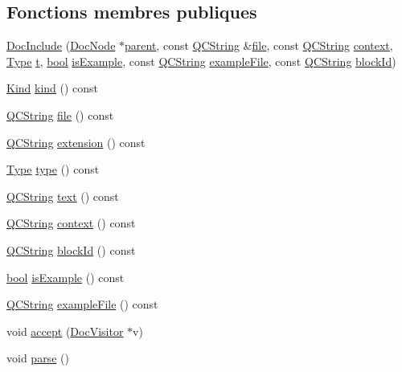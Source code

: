 \subsection*{Fonctions membres publiques}
\begin{DoxyCompactItemize}
\item 
\hyperlink{class_doc_include_aa4951530d659c138f2941a5827c8dbd9}{Doc\+Include} (\hyperlink{class_doc_node}{Doc\+Node} $\ast$\hyperlink{class_doc_node_a990d8b983962776a647e6231d38bd329}{parent}, const \hyperlink{class_q_c_string}{Q\+C\+String} \&\hyperlink{class_doc_include_a49b9503cc07277d253f236e955cf8c14}{file}, const \hyperlink{class_q_c_string}{Q\+C\+String} \hyperlink{class_doc_include_aaaf56e2383e4ac4aa921cfd38b2d9fdd}{context}, \hyperlink{class_doc_include_a72aa0fd397546547aadf356348ff3eaf}{Type} \hyperlink{058__bracket__recursion_8tcl_a69e959f6901827e4d8271aeaa5fba0fc}{t}, \hyperlink{qglobal_8h_a1062901a7428fdd9c7f180f5e01ea056}{bool} \hyperlink{class_doc_include_a73e2aff33b3bcf0ee6995c5f3af4be9b}{is\+Example}, const \hyperlink{class_q_c_string}{Q\+C\+String} \hyperlink{class_doc_include_aa54725d3a9ebb17c85b73890fae57fd8}{example\+File}, const \hyperlink{class_q_c_string}{Q\+C\+String} \hyperlink{class_doc_include_a81da494c0275017e56901b6c18dea3a8}{block\+Id})
\item 
\hyperlink{class_doc_node_aebd16e89ca590d84cbd40543ea5faadb}{Kind} \hyperlink{class_doc_include_ad1a68704c4dd1f8b70e2061709e9f20a}{kind} () const 
\item 
\hyperlink{class_q_c_string}{Q\+C\+String} \hyperlink{class_doc_include_a49b9503cc07277d253f236e955cf8c14}{file} () const 
\item 
\hyperlink{class_q_c_string}{Q\+C\+String} \hyperlink{class_doc_include_a47150b88e627477ba5fc355249f08761}{extension} () const 
\item 
\hyperlink{class_doc_include_a72aa0fd397546547aadf356348ff3eaf}{Type} \hyperlink{class_doc_include_ae30cfe2992872d3e8e9b46e4f453603f}{type} () const 
\item 
\hyperlink{class_q_c_string}{Q\+C\+String} \hyperlink{class_doc_include_ae7058876531c5a4ce4647555d2133db1}{text} () const 
\item 
\hyperlink{class_q_c_string}{Q\+C\+String} \hyperlink{class_doc_include_aaaf56e2383e4ac4aa921cfd38b2d9fdd}{context} () const 
\item 
\hyperlink{class_q_c_string}{Q\+C\+String} \hyperlink{class_doc_include_a81da494c0275017e56901b6c18dea3a8}{block\+Id} () const 
\item 
\hyperlink{qglobal_8h_a1062901a7428fdd9c7f180f5e01ea056}{bool} \hyperlink{class_doc_include_a73e2aff33b3bcf0ee6995c5f3af4be9b}{is\+Example} () const 
\item 
\hyperlink{class_q_c_string}{Q\+C\+String} \hyperlink{class_doc_include_aa54725d3a9ebb17c85b73890fae57fd8}{example\+File} () const 
\item 
void \hyperlink{class_doc_include_a93c7e5ac3c65445b45512ff29ad3be0b}{accept} (\hyperlink{class_doc_visitor}{Doc\+Visitor} $\ast$v)
\item 
void \hyperlink{class_doc_include_a191446e0b57311d58cf1ef51a91417ee}{parse} ()
\end{DoxyCompactItemize}
